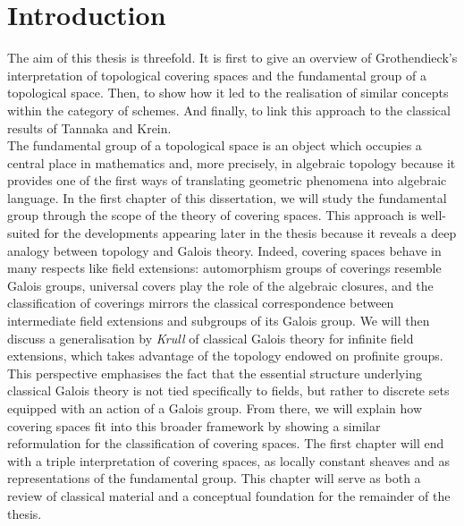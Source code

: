 \documentclass{article}
\theoremstyle{plain}
\theoremstyle{definition}
\begin{document}
\newpage
\tableofcontents
\newpage




\section*{Introduction}

The aim of this thesis is threefold. 
It is first to give an overview of Grothendieck's interpretation of topological covering spaces and the  fundamental group of a topological space.
Then, to show how it led to the realisation of similar concepts within the category of schemes.
And finally, to link this approach to the classical results of Tannaka and Krein.\\

The fundamental group of a topological space is an object which occupies a central place in mathematics and, more precisely, in algebraic topology because it provides one of the first ways of translating geometric phenomena into algebraic language.
In the first chapter of this dissertation, we will study the fundamental group through the scope of the theory of covering spaces. 
This approach is well-suited for the developments appearing later in the thesis because it reveals a deep analogy between topology and Galois theory.
Indeed, covering spaces behave in many respects like field extensions: automorphism groups of coverings resemble Galois groups, universal covers play the role of the algebraic closures, and the classification of coverings mirrors the classical correspondence between intermediate field extensions and subgroups of its Galois group.
We will then discuss a generalisation by \textit{Krull} of classical Galois theory for infinite field extensions, which takes advantage of the topology endowed on profinite groups. 
This perspective emphasises the fact that the essential structure underlying classical Galois theory is not tied specifically to fields, 
but rather to discrete sets equipped with an action of a Galois group.
From there, we will explain how covering spaces fit into this broader framework by showing a similar reformulation for the classification of covering spaces. 
The first chapter will end with a triple interpretation of covering spaces, as locally constant sheaves and as representations of the fundamental group.
This chapter will serve as both a review of classical material and a conceptual foundation for the remainder of the thesis.\\
\end{document}
